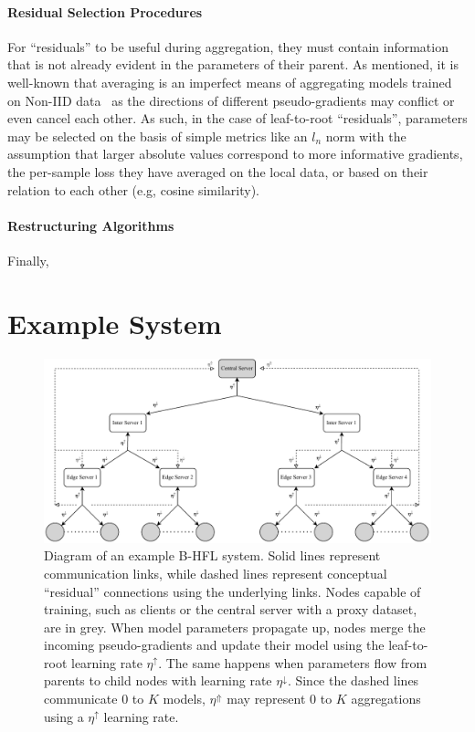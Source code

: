 \paragraph{Residual Selection Procedures} For ``residuals'' to be useful during aggregation, they must contain information that is not already evident in the parameters of their parent. As mentioned, it is well-known that averaging is an imperfect means of aggregating models trained on Non-IID data~\citep{FedAvg,LargeCohorts,OnTheConvergenceOfFedAvgOnNonIIDdata,FedProx} as the directions of different pseudo-gradients may conflict or even cancel each other. As such, in the case of leaf-to-root ``residuals'', parameters may be selected on the basis of simple metrics like an $l_n$ norm with the assumption that larger absolute values correspond to more informative gradients, the per-sample loss they have averaged on the local data, or based on their relation to each other (e.g, cosine similarity).
\paragraph{Restructuring Algorithms} Finally,

\section{Example System}\label{sec:example_system}
\begin{figure}[h]
    \centering
    \includegraphics[clip,width=\columnwidth]{plots/Tree_Structure.drawio.pdf}
    \caption[System Diagram]{Diagram of an example B-HFL system. Solid lines represent communication links, while dashed lines represent conceptual ``residual'' connections using the underlying links. Nodes capable of training, such as clients or the central server with a proxy dataset, are in grey. When model parameters propagate up, nodes merge the incoming pseudo-gradients and update their model using the leaf-to-root learning rate $\eta^\uparrow$. The same happens when parameters flow from parents to child nodes with learning rate $\eta^\downarrow$. Since the dashed lines communicate $0$ to $K$ models, $\eta^\Uparrow$ may represent $0$ to $K$ aggregations using a $\eta^\uparrow$ learning rate.}\label{fig:TreeStructure}
\end{figure}


